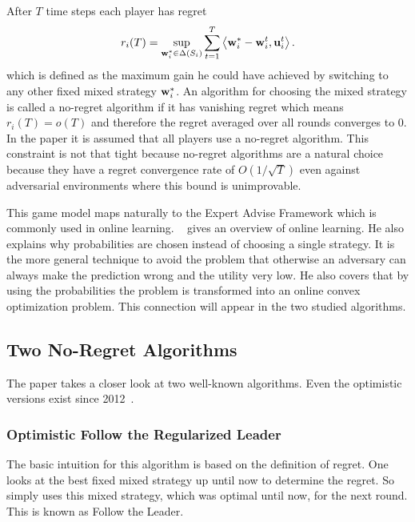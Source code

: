 \documentclass[a4paper]{article}
\theoremstyle{definition}
\renewcommand{\vec}[1]{\ensuremath{{\bf #1}}}
\newcommand{\dotp}[2]{\ensuremath{\left\langle #1, #2 \right\rangle}}
\begin{document}
After $T$ time steps each player has regret 
\begin{equation*}
r_i(T)
= \sup_{\vec{w}_i^*\in \Delta(S_i)} \sum_{t=1}^{T} \dotp{\vec{w}_i^*-\vec{w}_i^t}{ \vec{u}_i^t}. 
\end{equation*}
which is defined as the maximum gain he could have achieved by
switching to any other fixed mixed strategy $\vec{w}_i^*$.
An algorithm for choosing the mixed strategy is called a no-regret algorithm if it has vanishing
regret which means $r_i(T) = o(T)$ and therefore the regret averaged
over all rounds converges to 0.
In the paper it is assumed that all players use a no-regret algorithm.
This constraint is not that tight because no-regret algorithms are a
natural choice because they have a regret convergence rate of $O(1/\sqrt{T})$ even
against adversarial environments where this bound is unimprovable.


This game model maps naturally to the Expert Advise Framework which is
commonly used in online learning.
\citeauthor[]{Foundations}~\cite{Foundations} gives an overview of online learning.
He also explains why probabilities are chosen instead of choosing a
single strategy.
It is the more general technique to avoid the problem that otherwise
an adversary can always make the prediction wrong and the utility very
low.
He also covers that by using the probabilities the problem is
transformed into an online convex optimization problem.
This connection will appear in the two studied algorithms.



\subsection{Two No-Regret Algorithms}
\label{sec:two-no-regret}

The paper takes a closer look at two well-known algorithms.
Even the optimistic versions exist since 2012~\cite{OMD}.

\subsubsection{Optimistic Follow the Regularized Leader}
\label{sec:optim-foll-regul}
The basic intuition for this algorithm is based on the definition of
regret.
One looks at the best fixed mixed strategy up until now to determine
the regret.
So simply uses this mixed strategy, which was optimal until now, for
the next round. This is known as Follow the Leader.
\end{document}
